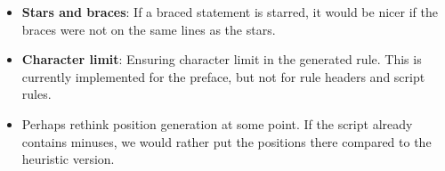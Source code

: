 \begin{itemize}
\begin{itemize}
\end{itemize}
\item \textbf{Stars and braces}: If a braced statement is starred, it would be nicer if the braces were not on the same lines as the stars.
\item \textbf{Character limit}: Ensuring character limit in the generated rule. This is currently implemented for the preface, but not for rule headers and script rules.
\item Perhaps rethink position generation at some point. If the script already contains minuses, we would rather put the positions there compared to the heuristic version.
\end{itemize}